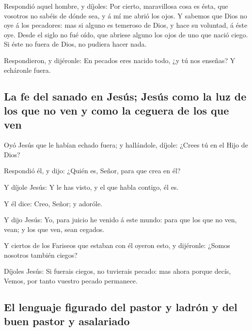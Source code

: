  Respondió aquel hombre, y díjoles: Por cierto,
maravillosa cosa es ésta, que vosotros no sabéis de dónde sea, y á mí me
abrió los ojos.  Y sabemos que Dios no oye á los
pecadores: mas si alguno es temeroso de Dios, y hace su voluntad, á éste
oye.  Desde el siglo no fué oído, que abriese alguno los
ojos de uno que nació ciego.  Si éste no fuera de Dios,
no pudiera hacer nada.

 Respondieron, y dijéronle: En pecados eres nacido todo,
¿y tú nos enseñas? Y echáronle fuera.

\hypertarget{la-fe-del-sanado-en-jesuxfas-jesuxfas-como-la-luz-de-los-que-no-ven-y-como-la-ceguera-de-los-que-ven}{%
\subsection{La fe del sanado en Jesús; Jesús como la luz de los que no
ven y como la ceguera de los que
ven}\label{la-fe-del-sanado-en-jesuxfas-jesuxfas-como-la-luz-de-los-que-no-ven-y-como-la-ceguera-de-los-que-ven}}

 Oyó Jesús que le habían echado fuera; y hallándole,
díjole: ¿Crees tú en el Hijo de Dios?

 Respondió él, y dijo: ¿Quién es, Señor, para que crea en
él?

 Y díjole Jesús: Y le has visto, y el que habla contigo,
él es.

 Y él dice: Creo, Señor; y adoróle.

 Y dijo Jesús: Yo, para juicio he venido á este mundo:
para que los que no ven, vean; y los que ven, sean cegados.

 Y ciertos de los Fariseos que estaban con él oyeron
esto, y dijéronle: ¿Somos nosotros también ciegos?

 Díjoles Jesús: Si fuerais ciegos, no tuvierais pecado:
mas ahora porque decís, Vemos, por tanto vuestro pecado permanece.

\hypertarget{el-lenguaje-figurado-del-pastor-y-ladruxf3n-y-del-buen-pastor-y-asalariado}{%
\subsection{El lenguaje figurado del pastor y ladrón y del buen pastor y
asalariado}\label{el-lenguaje-figurado-del-pastor-y-ladruxf3n-y-del-buen-pastor-y-asalariado}}

